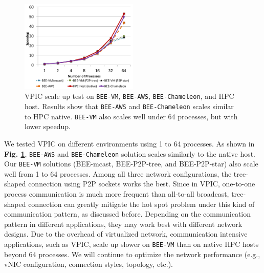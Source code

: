\begin{figure}[h]
    \centering
    \includegraphics[width=0.5\textwidth]{figures/vpic-test.pdf}
    \caption{VPIC scale up test on \texttt{BEE-VM}, \texttt{BEE-AWS}, \texttt{BEE-Chameleon}, and HPC host. Results show that \texttt{BEE-AWS} and \texttt{BEE-Chameleon} scales similar to HPC native. \texttt{BEE-VM} also scales well under 64 processes, but with lower speedup.}
    \label{vpic-test}
\end{figure}

We tested VPIC on different environments using 1 to 64 processes. As shown in \textbf{Fig. \ref{vpic-test}}, \texttt{BEE-AWS} and \texttt{BEE-Chameleon} solution scales similarly to the native host.  Our \texttt{BEE-VM} solutions (BEE-mcast, BEE-P2P-tree, and BEE-P2P-star) also scale well from 1 to 64 processes. Among all three network configurations, the tree-shaped connection using P2P sockets works the best. Since in VPIC, one-to-one process communication is much more frequent than all-to-all broadcast, tree-shaped connection can greatly mitigate the hot spot problem under this kind of communication pattern, as discussed before. Depending on the communication pattern in different applications, they may work best with different network designs. Due to the overhead of virtualized network, communication intensive applications, such as VPIC, scale up slower on \texttt{BEE-VM} than on native HPC hosts beyond 64 processes. We will continue to optimize the network performance (e.g., vNIC configuration, connection styles, topology, etc.).

